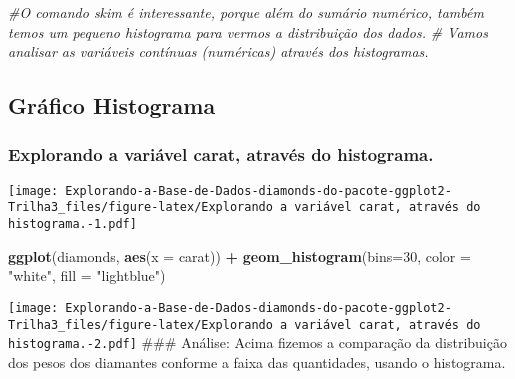 \documentclass[
]{article}
\newenvironment{Shaded}{\begin{snugshade}}{\end{snugshade}}
\newcommand{\CommentTok}[1]{\textcolor[rgb]{0.56,0.35,0.01}{\textit{#1}}}
\newcommand{\DataTypeTok}[1]{\textcolor[rgb]{0.13,0.29,0.53}{#1}}
\newcommand{\DecValTok}[1]{\textcolor[rgb]{0.00,0.00,0.81}{#1}}
\newcommand{\KeywordTok}[1]{\textcolor[rgb]{0.13,0.29,0.53}{\textbf{#1}}}
\newcommand{\NormalTok}[1]{#1}
\newcommand{\OperatorTok}[1]{\textcolor[rgb]{0.81,0.36,0.00}{\textbf{#1}}}
\newcommand{\StringTok}[1]{\textcolor[rgb]{0.31,0.60,0.02}{#1}}
\begin{document}
\begin{Shaded}
\begin{Highlighting}[]
\CommentTok{#O comando skim é interessante, porque além do sumário numérico, também temos um pequeno histograma para vermos a distribuição dos dados.  }
\CommentTok{# Vamos analisar as variáveis contínuas (numéricas) através dos histogramas. }
\end{Highlighting}
\end{Shaded}

\hypertarget{gruxe1fico-histograma}{%
\subsection{Gráfico Histograma}\label{gruxe1fico-histograma}}

\hypertarget{explorando-a-variuxe1vel-carat-atravuxe9s-do-histograma.}{%
\subsubsection{Explorando a variável carat, através do
histograma.}\label{explorando-a-variuxe1vel-carat-atravuxe9s-do-histograma.}}

\begin{Shaded}
\end{Shaded}

\texttt{[image: Explorando-a-Base-de-Dados-diamonds-do-pacote-ggplot2-Trilha3\_files/figure-latex/Explorando a variável carat, através do histograma.-1.pdf]}

\begin{Shaded}
\begin{Highlighting}[]
\KeywordTok{ggplot}\NormalTok{(diamonds, }\KeywordTok{aes}\NormalTok{(}\DataTypeTok{x =}\NormalTok{ carat)) }\OperatorTok{+}\StringTok{ }\KeywordTok{geom_histogram}\NormalTok{(}\DataTypeTok{bins=}\DecValTok{30}\NormalTok{, }\DataTypeTok{color =} \StringTok{"white"}\NormalTok{, }\DataTypeTok{fill =} \StringTok{"lightblue"}\NormalTok{)}
\end{Highlighting}
\end{Shaded}

\texttt{[image: Explorando-a-Base-de-Dados-diamonds-do-pacote-ggplot2-Trilha3\_files/figure-latex/Explorando a variável carat, através do histograma.-2.pdf]}
\#\#\# Análise: Acima fizemos a comparação da distribuição dos pesos dos
diamantes conforme a faixa das quantidades, usando o histograma.
\end{document}
